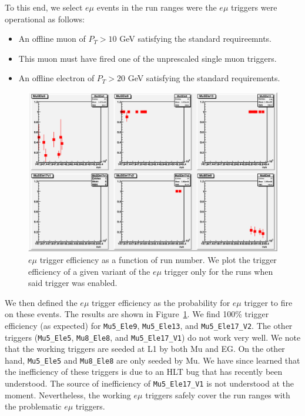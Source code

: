 To this end, we select $e\mu$ events in the run ranges were the
$e\mu$ triggers were operational as follows:
\begin{itemize}
\item An offline muon of $P_T > 10$ GeV satisfying the standard
requireemnts.
\item This muon must have fired one of the unprescaled single muon triggers.
\item An offline electron of $P_T > 20$ GeV satisfying the standard requirements.
\end{itemize}



\begin{figure}[hbt]
\begin{center}
\includegraphics[width=\linewidth]{emu_trigger.png}
\caption{\label{fig:emutrg}\protect $e\mu$ trigger efficiency
as a function of run number.  We plot the trigger 
efficiency of a given variant of the $e\mu$ trigger only for
the runs when said trigger was enabled.} 
\end{center}
\end{figure}


We then defined the $e\mu$ trigger efficiency as the probability
for $e\mu$ trigger to fire on these events.
The results are shown in Figure~\ref{fig:emutrg}.  We find 100\%
trigger efficiency (as expected) for {\tt Mu5\_Ele9}, {\tt Mu5\_Ele13},
and {\tt Mu5\_Ele17\_V2}.  The other triggers ({\tt Mu5\_Ele5},
{\tt Mu8\_Ele8}, and {\tt Mu5\_Ele17\_V1}) do not work very well.  
We note that the working triggers are seeded at L1 by both Mu and EG.
On the other hand, {\tt Mu5\_Ele5} and {\tt Mu8\_Ele8} are only seeded
by Mu. We have since learned\cite{ref:harper} that the inefficiency
of these triggers is due to an HLT bug that has recently been understood.
The source of inefficiency of {\tt Mu5\_Ele17\_V1}
is not understood
at the moment.  Nevertheless, the working $e\mu$ triggers safely 
cover the run ranges with the problematic $e\mu$ triggers.

